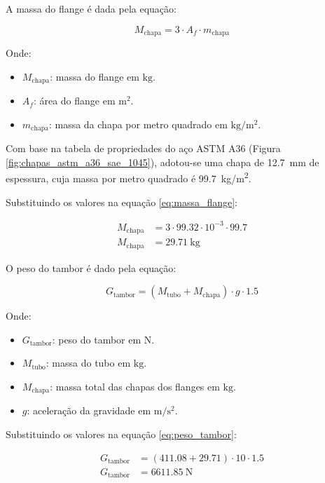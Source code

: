 A massa do flange é dada pela equação:

\begin{equation}
  M_{\text{chapa}} = 3 \cdot A_f \cdot m_{\text{chapa}}
  \label{eq:massa_flange}
\end{equation}

Onde:

\begin{itemize}[leftmargin=1.25cm]
  \item $M_{\text{chapa}}$: massa do flange em $\si{\kilo\gram}$.
  \item $A_f$: área do flange em $\si{\meter^2}$.
  \item $m_{\text{chapa}}$: massa da chapa por metro quadrado em $\si{\kilo\gram/\meter^2}$.
\end{itemize}

\vspace{1em}

Com base na tabela de propriedades do aço ASTM A36 (Figura \ref{fig:chapas_astm_a36_sae_1045}), adotou-se uma chapa de \SI{12.7}{\milli\meter} de espessura, cuja massa por metro quadrado é \SI{99.7}{\kilo\gram/\meter^2}.

Substituindo os valores na equação \eqref{eq:massa_flange}:

\begin{align*}
  M_{\text{chapa}} & = 3 \cdot \num{99.32} \cdot 10^{-3} \cdot \num{99.7} \\
  M_{\text{chapa}} & = \boxed{\SI{29.71}{\kilo\gram}}
\end{align*}

O peso do tambor é dado pela equação:

\begin{equation}
  G_{\text{tambor}} = \left(M_{\text{tubo}} + M_{\text{chapa}}\right) \cdot g \cdot \num{1.5}
  \label{eq:peso_tambor}
\end{equation}

Onde:

\begin{itemize}[leftmargin=1.25cm]
  \item $G_{\text{tambor}}$: peso do tambor em $\si{\newton}$.
  \item $M_{\text{tubo}}$: massa do tubo em $\si{\kilo\gram}$.
  \item $M_{\text{chapa}}$: massa total das chapas dos flanges em $\si{\kilo\gram}$.
  \item $g$: aceleração da gravidade em $\si{\meter\per\second\squared}$.
\end{itemize}

\vspace{1em}

Substituindo os valores na equação \eqref{eq:peso_tambor}:

\begin{align*}
  G_{\text{tambor}} & = \left(\num{411.08} + \num{29.71}\right) \cdot 10 \cdot \num{1.5} \\
  G_{\text{tambor}} & = \boxed{\SI{6611.85}{\newton}}
\end{align*}
